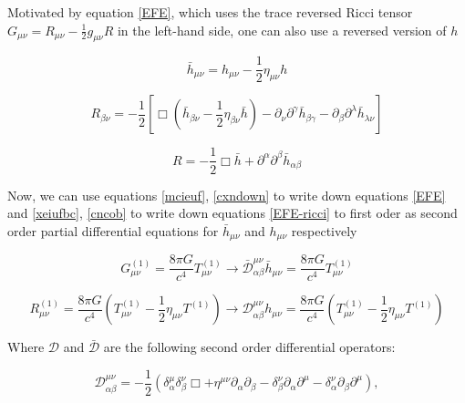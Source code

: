 Motivated by equation \ref{EFE},  which uses the trace reversed Ricci tensor $G_{\mu \nu}= R_{\mu\nu}-\frac{1}{2} g_{\mu\nu} R$ in the left-hand side, one can also use a reversed version of $h$


\begin{equation}
\bar{h}_{\mu\nu} = h_{\mu\nu}-\frac{1}{2} \eta_{\mu\nu} h
\end{equation}

\begin{equation}\label{xeiufbc}
R_{\beta \nu} = -\frac{1}{2} [ \Box( \bar{h}_{\beta \nu}-\frac{1}{2} \eta_{\beta \nu} \bar{h} ) - \partial_{\nu} \partial^{\gamma} \bar{h}_{\beta \gamma} - \partial_{\beta} \partial^{\lambda} \bar{h}_{\lambda \nu} ]
\end{equation}

\begin{equation}\label{cncob}
R = -\frac{1}{2} \Box \bar{h} + \partial^{\alpha}\partial^{\beta} \bar{h}_{\alpha \beta}
\end{equation}


Now, we can use equations \ref{mcieuf}, \ref{cxndown} to write down equations \ref{EFE} and  \ref{xeiufbc}, \ref{cncob} to write down equations \ref{EFE-ricci} to first oder as second order partial differential equations for $\bar{h}_{\mu \nu}$ and $h_{\mu\nu}$ respectively

\begin{equation}\label{hbar}
G^{(1)}_{\mu\nu} = \frac{8\pi G}{c^4} T^{(1)}_{\mu\nu} \rightarrow \bar{\mathcal{D}}^{\mu\nu}_{\alpha \beta} \bar{h}_{\mu\nu} = \frac{8\pi G}{c^4} T^{(1)}_{\mu\nu}
\end{equation}


\begin{equation}\label{h}
R^{(1)}_{\mu\nu} = \frac{8\pi G}{c^4}(T^{(1)}_{\mu\nu} - \frac{1}{2} \eta_{\mu\nu}T^{(1)}) \rightarrow \mathcal{D}^{\mu\nu}_{\alpha \beta} h_{\mu\nu} = \frac{8\pi G}{c^4}(T^{(1)}_{\mu\nu} - \frac{1}{2} \eta_{\mu\nu}T^{(1)})
\end{equation}


Where $\mathcal{D}$ and $\mathcal{\bar{D}}$ are the following second order differential operators:

\begin{equation}\label{D}
\mathcal{D}^{\mu\nu}_{\alpha \beta} = -\frac{1}{2}( \delta^{\mu}_{\alpha} \delta^{\nu}_{\beta} \Box + \eta^{\mu\nu}\partial_{\alpha}\partial_{\beta} - \delta^{\nu}_{\beta} \partial_{\alpha}\partial^{\mu} - \delta^{\nu}_{\alpha} \partial_{\beta}\partial^{\mu}),
\end{equation}

